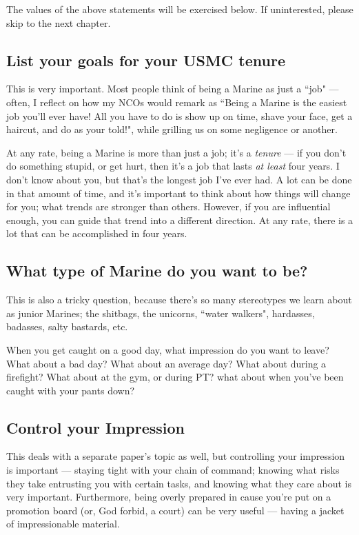 The values of the above statements will be exercised below. If uninterested, please skip to the
next chapter.

\subsection{List your goals for your USMC tenure}

This is very important. Most people think of being a Marine as just a ``job" --- often,
I reflect on how my NCOs would remark as ``Being a Marine is the easiest job
you'll ever have! All you have to do is show up on time, shave your face, get
a haircut, and do as your told!", while grilling us on some negligence or another.

At any rate, being a Marine is more than just a job; it's a \textit{tenure} --- if
you don't do something stupid, or get hurt, then it's a job that lasts \textit{at least}
four years. I don't know about you, but that's the longest job I've ever had.
A lot can be done in that amount of time, and it's important to think about how
things will change for you; what trends are stronger than others. However, if you
are influential enough, you can guide that trend into a different direction.
At any rate, there is a lot that can be accomplished in four years.

\subsection{What type of Marine do you want to be?}

This is also a tricky question, because there's so many stereotypes we learn about
as junior Marines; the shitbags, the unicorns, ``water walkers", hardasses,
badasses, salty bastards, etc.

When you get caught on a good day, what impression do you want to leave? What
about a bad day? What about an average day? What about during a firefight?
What about at the gym, or during PT? what about when you've been caught with
your pants down?

\subsection{Control your Impression}

This deals with a separate paper's topic as well, but controlling your impression
is important --- staying tight with your chain of command; knowing what risks
they take entrusting you with certain tasks, and knowing what they care about
is very important. Furthermore, being overly prepared in cause you're put on
a promotion board (or, God forbid, a court) can be very useful --- having
a jacket of impressionable material.

